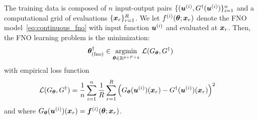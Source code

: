 The training data is composed of $n$ input-output pairs $\{({\bm{u}}^{(i)},G^\dagger({\bm{u}}^{(i)})\}_{i=1}^n$ and a computational grid of evaluations $\{{\bm{x}}_{r}\}_{r=1}^R$. We let $f^{(i)}({\bm{\theta}};{\bm{x}}_r)$ denote the FNO model~\eqref{eq:continuous_fno} with input function ${\bm{u}}^{(i)}$ and evaluated at ${\bm{x}}_r$. Then, the FNO learning problem is %
the minimization:
\begin{equation}
    {\bm{\theta}}^{\dagger}_{\rm (fno)} \in \underset{{{\bm{\theta}} \in {\mathbb{R}}^{p+F+q}}}{\operatorname{argmin}}~ {\mathcal{L}} (G_{{\bm{\theta}}}, G^{\dagger}) 
    \label{eq:fno_loss}
\end{equation}
with empirical loss function
\begin{equation}
\label{eq:loss-fno}
\begin{aligned}
    &{\mathcal{L}} (G_{{\bm{\theta}}}, G^{\dagger})=\frac{1}{n}\sum_{i=1}^n \frac{1}{R} \sum_{r=1}^R \left( 
        G_{{\bm{\theta}}}({{\bm{u}}^{(i)}})({\bm{x}}_r) - G^{\dagger}({\bm{u}}^{(i)})({\bm{x}}_r)
    \right)^2
\end{aligned}
\end{equation}
and where $G_{{\bm{\theta}}}({\bm{u}}^{(i)})({\bm{x}}_{r})={\bm{f}}^{(i)}({\bm{\theta}};{\bm{x}}_{r})$.

%
